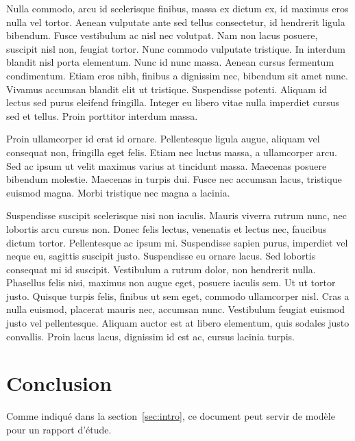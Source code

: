 \documentclass[twoside,openright,a4paper,11pt,french]{article}
\begin{document}
Nulla commodo, arcu id scelerisque finibus, massa ex dictum ex, id maximus eros nulla vel tortor. Aenean vulputate ante sed tellus consectetur, id hendrerit ligula bibendum. Fusce vestibulum ac nisl nec volutpat. Nam non lacus posuere, suscipit nisl non, feugiat tortor. Nunc commodo vulputate tristique. In interdum blandit nisl porta elementum. Nunc id nunc massa. Aenean cursus fermentum condimentum. Etiam eros nibh, finibus a dignissim nec, bibendum sit amet nunc. Vivamus accumsan blandit elit ut tristique. Suspendisse potenti. Aliquam id lectus sed purus eleifend fringilla. Integer eu libero vitae nulla imperdiet cursus sed et tellus. Proin porttitor interdum massa.

Proin ullamcorper id erat id ornare. Pellentesque ligula augue, aliquam vel consequat non, fringilla eget felis. Etiam nec luctus massa, a ullamcorper arcu. Sed ac ipsum ut velit maximus varius at tincidunt massa. Maecenas posuere bibendum molestie. Maecenas in turpis dui. Fusce nec accumsan lacus, tristique euismod magna. Morbi tristique nec magna a lacinia.

Suspendisse suscipit scelerisque nisi non iaculis. Mauris viverra rutrum nunc, nec lobortis arcu cursus non. Donec felis lectus, venenatis et lectus nec, faucibus dictum tortor. Pellentesque ac ipsum mi. Suspendisse sapien purus, imperdiet vel neque eu, sagittis suscipit justo. Suspendisse eu ornare lacus. Sed lobortis consequat mi id suscipit. Vestibulum a rutrum dolor, non hendrerit nulla. Phasellus felis nisi, maximus non augue eget, posuere iaculis sem. Ut ut tortor justo. Quisque turpis felis, finibus ut sem eget, commodo ullamcorper nisl. Cras a nulla euismod, placerat mauris nec, accumsan nunc. Vestibulum feugiat euismod justo vel pellentesque. Aliquam auctor est at libero elementum, quis sodales justo convallis. Proin lacus lacus, dignissim id est ac, cursus lacinia turpis.

\section{Conclusion}
\label{sec:ccl}
Comme indiqué dans la section~\ref{sec:intro}, ce document peut servir de modèle pour un rapport d'étude.

\cleardoublepage
{}


\end{document}
